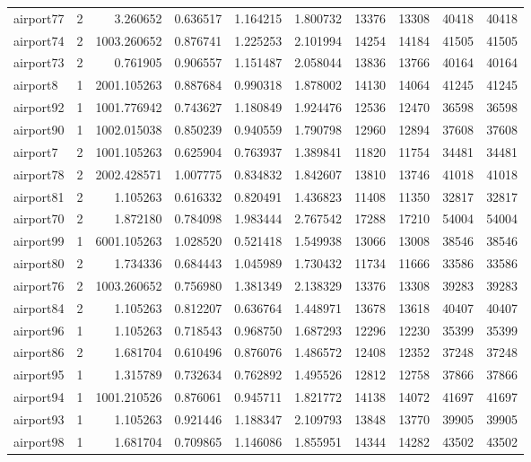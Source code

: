 \begin{longtable}{|l|r|r|r|r|r|r|r|r|r|}
airport77 & 2 & 3.260652 & 0.636517 & 1.164215 & 1.800732 & 13376 & 13308 & 40418 & 40418 \\
airport74 & 2 & 1003.260652 & 0.876741 & 1.225253 & 2.101994 & 14254 & 14184 & 41505 & 41505 \\
airport73 & 2 & 0.761905 & 0.906557 & 1.151487 & 2.058044 & 13836 & 13766 & 40164 & 40164 \\
airport8 & 1 & 2001.105263 & 0.887684 & 0.990318 & 1.878002 & 14130 & 14064 & 41245 & 41245 \\
airport92 & 1 & 1001.776942 & 0.743627 & 1.180849 & 1.924476 & 12536 & 12470 & 36598 & 36598 \\
airport90 & 1 & 1002.015038 & 0.850239 & 0.940559 & 1.790798 & 12960 & 12894 & 37608 & 37608 \\
airport7 & 2 & 1001.105263 & 0.625904 & 0.763937 & 1.389841 & 11820 & 11754 & 34481 & 34481 \\
airport78 & 2 & 2002.428571 & 1.007775 & 0.834832 & 1.842607 & 13810 & 13746 & 41018 & 41018 \\
airport81 & 2 & 1.105263 & 0.616332 & 0.820491 & 1.436823 & 11408 & 11350 & 32817 & 32817 \\
airport70 & 2 & 1.872180 & 0.784098 & 1.983444 & 2.767542 & 17288 & 17210 & 54004 & 54004 \\
airport99 & 1 & 6001.105263 & 1.028520 & 0.521418 & 1.549938 & 13066 & 13008 & 38546 & 38546 \\
airport80 & 2 & 1.734336 & 0.684443 & 1.045989 & 1.730432 & 11734 & 11666 & 33586 & 33586 \\
airport76 & 2 & 1003.260652 & 0.756980 & 1.381349 & 2.138329 & 13376 & 13308 & 39283 & 39283 \\
airport84 & 2 & 1.105263 & 0.812207 & 0.636764 & 1.448971 & 13678 & 13618 & 40407 & 40407 \\
airport96 & 1 & 1.105263 & 0.718543 & 0.968750 & 1.687293 & 12296 & 12230 & 35399 & 35399 \\
airport86 & 2 & 1.681704 & 0.610496 & 0.876076 & 1.486572 & 12408 & 12352 & 37248 & 37248 \\
airport95 & 1 & 1.315789 & 0.732634 & 0.762892 & 1.495526 & 12812 & 12758 & 37866 & 37866 \\
airport94 & 1 & 1001.210526 & 0.876061 & 0.945711 & 1.821772 & 14138 & 14072 & 41697 & 41697 \\
airport93 & 1 & 1.105263 & 0.921446 & 1.188347 & 2.109793 & 13848 & 13770 & 39905 & 39905 \\
airport98 & 1 & 1.681704 & 0.709865 & 1.146086 & 1.855951 & 14344 & 14282 & 43502 & 43502 \\

\end{longtable}
